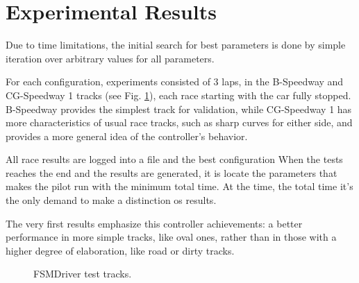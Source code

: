 \section{Experimental Results}
Due to time limitations, the initial search for best parameters is done by simple
iteration over arbitrary values for all parameters.






For each configuration, experiments consisted of 3 laps, in the B-Speedway and 
CG-Speedway 1 tracks (see Fig. \ref{fig:tracks}), each race starting with the car fully stopped. B-Speedway provides the simplest track for validation, while CG-Speedway 1
has more characteristics of usual race tracks, such as sharp curves for either side,
and provides a more general idea of the controller's behavior.

All race results are logged into a file and the best configuration  
When the tests reaches the end and the results are generated, it is locate the 
parameters that makes the pilot run with the minimum total time. At the time, the total time it's the only demand to make a distinction os results.

The very first results emphasize this controller achievements: a better performance in more simple tracks, like oval ones, rather than in those with a higher degree of elaboration, like road or dirty tracks.


\begin{figure}[!t] 
\centering 
{}
\hfill
{}
\caption{FSMDriver test tracks.} 
\label{fig:tracks} 
\end{figure} 



